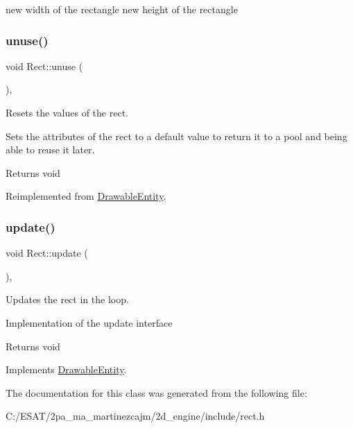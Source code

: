new width of the rectangle  new height of the rectangle \mbox{\label{class_rect_a85afbe7fde3b74bd81c07cc58d5c61bd}} 
\subsubsection{\texorpdfstring{unuse()}{unuse()}}
{\footnotesize\ttfamily void Rect\+::unuse (\begin{DoxyParamCaption}{ }\end{DoxyParamCaption})\hspace{0.3cm}{\ttfamily [override]}, {\ttfamily [virtual]}}



Resets the values of the rect. 

Sets the attributes of the rect to a default value to return it to a pool and being able to reuse it later.

\begin{DoxyReturn}{Returns}
void 
\end{DoxyReturn}


Reimplemented from \hyperlink{class_drawable_entity_aabea8715834f6cee7fd36b038d1a4843}{Drawable\+Entity}.

\mbox{\label{class_rect_af74b7ea3228d0d7b4c40bb8fe6daed63}} 
\subsubsection{\texorpdfstring{update()}{update()}}
{\footnotesize\ttfamily void Rect\+::update (\begin{DoxyParamCaption}{ }\end{DoxyParamCaption})\hspace{0.3cm}{\ttfamily [override]}, {\ttfamily [virtual]}}



Updates the rect in the loop. 

Implementation of the update interface

\begin{DoxyReturn}{Returns}
void 
\end{DoxyReturn}


Implements \hyperlink{class_drawable_entity_acbf8317de062a2e0e79f646dbe75249c}{Drawable\+Entity}.



The documentation for this class was generated from the following file\+:\begin{DoxyCompactItemize}
\item 
C\+:/\+E\+S\+A\+T/2pa\+\_\+ma\+\_\+martinezcajm/2d\+\_\+engine/include/rect.\+h\end{DoxyCompactItemize}

